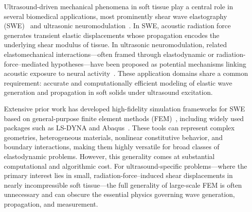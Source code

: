 \documentclass[11pt]{article}
\begin{document}
Ultrasound-driven mechanical phenomena in soft tissue play a central role in
several biomedical applications, most prominently shear wave
elastography (SWE)~\cite{sarvazyan1998elasticity,barr2015elastography,gennisson2013ultrasound,sigrist2017ultrasound} and ultrasonic neuromodulation~\cite{blackmore2019ultrasound,jones2022neuromodulation,pinton2012braintherapy}. In SWE, acoustic radiation
force~\cite{nightingale2002radiation,palmeri2011radiation,nyborg1965acoustic,torr1984acoustic} generates transient elastic displacements whose propagation encodes the
underlying shear modulus of tissue. In ultrasonic neuromodulation, related
elastomechanical interactions—often framed through elastodynamic or
radiation-force–mediated hypotheses—have been proposed as potential mechanisms
linking acoustic exposure to neural activity~\cite{blackmore2019ultrasound,kubanek2018neuromodulation,yoo2022focused}. These application domains share a
common requirement: accurate and computationally efficient modeling of elastic
wave generation and propagation in soft solids under ultrasound excitation.

Extensive prior work has developed high-fidelity simulation frameworks for SWE
based on general-purpose finite element methods (FEM)~\cite{hughes2000finite,zienkiewicz2005finite}, including widely used
packages such as LS-DYNA and Abaqus~\cite{bercoff2004supersonic,capuzzi2018numerical}. These tools can represent complex
geometries, heterogeneous materials, nonlinear constitutive behavior, and
boundary interactions, making them highly versatile for broad classes of
elastodynamic problems. However, this generality comes at substantial
computational and algorithmic cost. For ultrasound-specific problems—where the
primary interest lies in small, radiation-force–induced shear displacements in
nearly incompressible soft tissue—the full generality of large-scale FEM is
often unnecessary and can obscure the essential physics governing wave
generation, propagation, and measurement.
\end{document}
